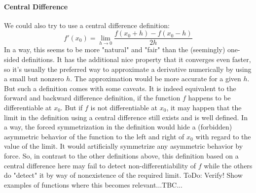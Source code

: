 \paragraph{Central Difference} 
We could also try to use a central difference definition:
\begin{equation}
 f'(x_0) = \lim_{h \rightarrow 0} \frac{f(x_0+h) - f(x_0-h)}{2 h}
\end{equation}
In a way, this seems to be more "natural" and "fair" than the (seemingly) one-sided definitions. It has the additional nice property that it converges even faster, so it's usually the preferred way to approximate a derivative numerically by using a small but nonzero $h$. The approximation would be more accurate for a given $h$. But such a definition comes with some caveats. It is indeed equivalent to the forward and backward difference definition, if the function $f$ happens to be differentiable at $x_0$. But if $f$ is not differentiable at $x_0$, it may happen that the limit in the definition using a central difference still exists and is well defined. In a way, the forced symmetrization in the definition would hide a (forbidden) asymmetric behavior of the function to the left and right of $x_0$ with regard to the value of the limit. It would artificially symmetrize any asymmetric behavior by force. So, in contrast to the other definitions above, this definition based on a central difference here may fail to detect non-differentiability of $f$ while the others do "detect" it by way of nonexistence of the required limit. ToDo: Verify! Show examples of functions where this becomes relevant...TBC...

%


